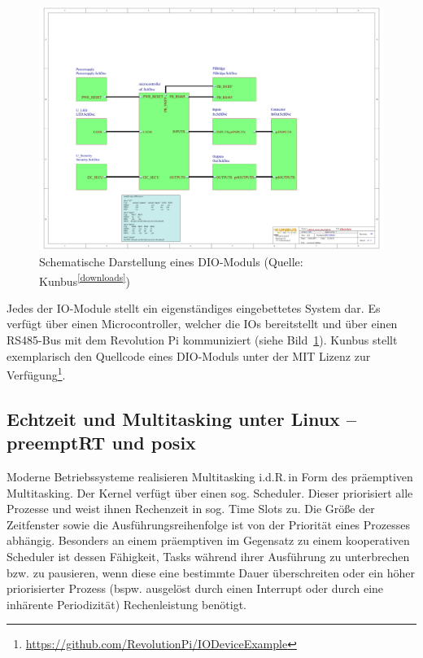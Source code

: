 \begin{figure}[h]
    \centering
    \includegraphics[trim={4cm 7cm 10.5cm 7.3cm}, clip, width=\textwidth]{literature/SchematicPrintsRevPi-DIO}
    \caption{Schematische Darstellung eines DIO-Moduls (Quelle: Kunbus\textsuperscript{\ref{downloads}})
      \label{fig:dio}}
\end{figure}

Jedes der IO-Module stellt ein eigenständiges eingebettetes System dar. Es verfügt
über einen Microcontroller, welcher die IOs bereitstellt und über einen RS485-Bus
mit dem Revolution Pi kommuniziert (siehe Bild~\ref{fig:dio}). 
Kunbus stellt exemplarisch den Quellcode eines DIO-Moduls unter der MIT Lizenz zur
Verfügung\footnote{\url{https://github.com/RevolutionPi/IODeviceExample}}. 


\subsection{Echtzeit und Multitasking unter Linux -- preemptRT und posix%
     \label{sec:2-echtzeit}}
     
Moderne Betriebssysteme realisieren Multitasking i.d.R.\,in Form des präemptiven Multitasking. 
Der Kernel verfügt über einen sog. Scheduler. Dieser priorisiert alle Prozesse und weist ihnen 
Rechenzeit in sog. Time Slots zu. Die Größe der Zeitfenster sowie die Ausführungsreihenfolge 
ist von der Priorität eines Prozesses abhängig. Besonders an einem präemptiven im Gegensatz zu einem kooperativen Scheduler ist dessen Fähigkeit, Tasks während ihrer Ausführung zu unterbrechen bzw. zu pausieren, wenn diese eine bestimmte Dauer überschreiten oder ein höher priorisierter Prozess (bspw. ausgelöst durch einen Interrupt oder durch eine inhärente Periodizität) Rechenleistung benötigt.

